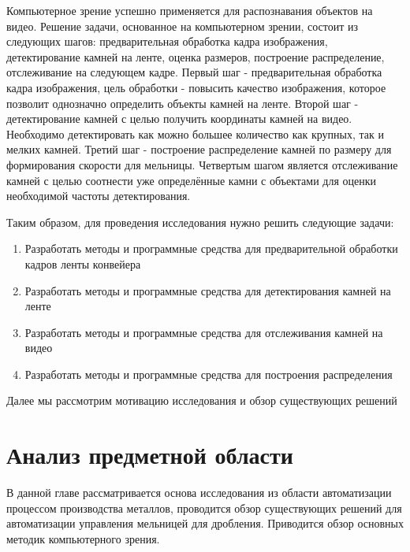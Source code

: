 \documentclass[times]{itmo-student-thesis}
\begin{document}
Компьютерное зрение успешно применяется для распознавания объектов на видео. Решение задачи, основанное на компьютерном зрении, состоит из следующих шагов: предварительная обработка кадра изображения, детектирование камней на ленте, оценка размеров, построение распределение, отслеживание на следующем кадре.
Первый шаг - предварительная обработка кадра изображения, цель обработки - повысить качество изображения, которое позволит однозначно определить объекты камней на ленте. Второй шаг - детектирование камней с целью получить координаты камней на видео. Необходимо детектировать как можно большее количество как крупных, так и мелких камней. Третий шаг - построение распределение камней по размеру для формирования скорости для мельницы. Четвертым шагом является отслеживание камней с целью соотнести уже определённые камни с объектами для оценки необходимой частоты детектирования.

Таким образом, для проведения исследования нужно решить следующие задачи:
\begin{enumerate}
	\item Разработать методы и программные средства для предварительной обработки кадров ленты конвейера
	\item Разработать методы и программные средства для детектирования камней на ленте
	\item Разработать методы и программные средства для отслеживания камней на видео
	\item Разработать методы и программные средства для построения распределения
\end{enumerate}

Далее мы рассмотрим мотивацию исследования и обзор существующих решений







\chapter{Анализ предметной области}
В данной главе рассматривается основа исследования из области автоматизации процессом производства металлов, проводится обзор существующих решений для автоматизации управления мельницей для дробления. Приводится обзор основных методик компьютерного зрения.
\startrelatedwork
\end{document}
